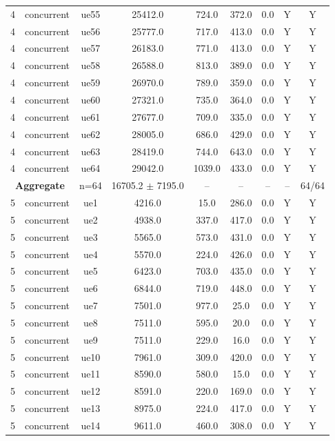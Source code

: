 \begin{table}[ht]
\begin{tabular}{|c|c|c|c|c|c|c|c|c|}
4 & concurrent & ue55 & 25412.0 & 724.0 & 372.0 & 0.0 & Y & Y \\
4 & concurrent & ue56 & 25777.0 & 717.0 & 413.0 & 0.0 & Y & Y \\
4 & concurrent & ue57 & 26183.0 & 771.0 & 413.0 & 0.0 & Y & Y \\
4 & concurrent & ue58 & 26588.0 & 813.0 & 389.0 & 0.0 & Y & Y \\
4 & concurrent & ue59 & 26970.0 & 789.0 & 359.0 & 0.0 & Y & Y \\
4 & concurrent & ue60 & 27321.0 & 735.0 & 364.0 & 0.0 & Y & Y \\
4 & concurrent & ue61 & 27677.0 & 709.0 & 335.0 & 0.0 & Y & Y \\
4 & concurrent & ue62 & 28005.0 & 686.0 & 429.0 & 0.0 & Y & Y \\
4 & concurrent & ue63 & 28419.0 & 744.0 & 643.0 & 0.0 & Y & Y \\
4 & concurrent & ue64 & 29042.0 & 1039.0 & 433.0 & 0.0 & Y & Y \\
\multicolumn{2}{|c|}{\textbf{Aggregate}} & n=64 & 16705.2 $\pm$ 7195.0 & -- & -- & -- & -- & 64/64 \\
\hline
5 & concurrent & ue1 & 4216.0 & 15.0 & 286.0 & 0.0 & Y & Y \\
5 & concurrent & ue2 & 4938.0 & 337.0 & 417.0 & 0.0 & Y & Y \\
5 & concurrent & ue3 & 5565.0 & 573.0 & 431.0 & 0.0 & Y & Y \\
5 & concurrent & ue4 & 5570.0 & 224.0 & 426.0 & 0.0 & Y & Y \\
5 & concurrent & ue5 & 6423.0 & 703.0 & 435.0 & 0.0 & Y & Y \\
5 & concurrent & ue6 & 6844.0 & 719.0 & 448.0 & 0.0 & Y & Y \\
5 & concurrent & ue7 & 7501.0 & 977.0 & 25.0 & 0.0 & Y & Y \\
5 & concurrent & ue8 & 7511.0 & 595.0 & 20.0 & 0.0 & Y & Y \\
5 & concurrent & ue9 & 7511.0 & 229.0 & 16.0 & 0.0 & Y & Y \\
5 & concurrent & ue10 & 7961.0 & 309.0 & 420.0 & 0.0 & Y & Y \\
5 & concurrent & ue11 & 8590.0 & 580.0 & 15.0 & 0.0 & Y & Y \\
5 & concurrent & ue12 & 8591.0 & 220.0 & 169.0 & 0.0 & Y & Y \\
5 & concurrent & ue13 & 8975.0 & 224.0 & 417.0 & 0.0 & Y & Y \\
5 & concurrent & ue14 & 9611.0 & 460.0 & 308.0 & 0.0 & Y & Y \\

\end{tabular}
\end{table}

